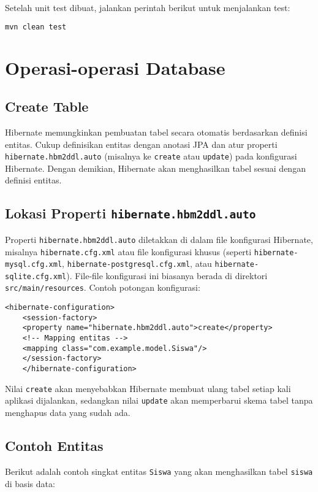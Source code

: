 Setelah unit test dibuat, jalankan perintah berikut untuk menjalankan test:

\begin{lstlisting}[language=bash, style=XmlStyle]
	mvn clean test
\end{lstlisting}


\section{Operasi-operasi Database}

\subsection{Create Table}

Hibernate memungkinkan pembuatan tabel secara otomatis berdasarkan definisi entitas. Cukup definisikan entitas dengan anotasi JPA dan atur properti \texttt{hibernate.hbm2ddl.auto} (misalnya ke \texttt{create} atau \texttt{update}) pada konfigurasi Hibernate. Dengan demikian, Hibernate akan menghasilkan tabel sesuai dengan definisi entitas.

\subsection*{Lokasi Properti \texttt{hibernate.hbm2ddl.auto}}
Properti \texttt{hibernate.hbm2ddl.auto} diletakkan di dalam file konfigurasi Hibernate, misalnya \texttt{hibernate.cfg.xml} atau file konfigurasi khusus (seperti \texttt{hibernate-mysql.cfg.xml}, \texttt{hibernate-postgresql.cfg.xml}, atau \texttt{hibernate-sqlite.cfg.xml}). File-file konfigurasi ini biasanya berada di direktori \texttt{src/main/resources}. Contoh potongan konfigurasi:
\begin{lstlisting}[style=XmlStyle]
	<hibernate-configuration>
	<session-factory>
	<property name="hibernate.hbm2ddl.auto">create</property>
	<!-- Mapping entitas -->
	<mapping class="com.example.model.Siswa"/>
	</session-factory>
	</hibernate-configuration>
\end{lstlisting}
Nilai \texttt{create} akan menyebabkan Hibernate membuat ulang tabel setiap kali aplikasi dijalankan, sedangkan nilai \texttt{update} akan memperbarui skema tabel tanpa menghapus data yang sudah ada.

\subsection*{Contoh Entitas}
Berikut adalah contoh singkat entitas \texttt{Siswa} yang akan menghasilkan tabel \texttt{siswa} di basis data:

